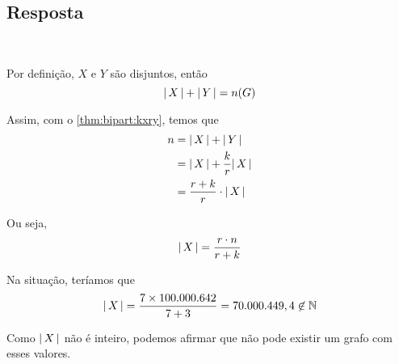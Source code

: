 \subsection{Resposta} ~

Por definição, $X$ e $Y$ são disjuntos, então
\[
    {\left\lvert\,X\,\right\rvert} + {\left\lvert\,Y\,\right\rvert} = n(G)
\]

Assim, com o \cref{thm:bipart:kxry}, temos que
\begin{align*}
    n &= {\left\lvert\,X\,\right\rvert} + {\left\lvert\,Y\,\right\rvert} \\
        &= {\left\lvert\,X\,\right\rvert} + \frac{k}{r} {\left\lvert\,X\,\right\rvert} \\
        &= \frac{r + k}{r} \cdot {\left\lvert\,X\,\right\rvert}
\end{align*}

Ou seja,
\[
    {\left\lvert\,X\,\right\rvert} = \frac{r \cdot n}{r + k}
\]

Na situação, teríamos que
\[
    {\left\lvert\,X\,\right\rvert} = \frac{7 \times 100.000.642}{7 + 3} = 70.000.449,4 \not\in \operatorname{\mathbb{N}}
\]

Como ${\left\lvert\,X\,\right\rvert}$ não é inteiro, podemos afirmar que não pode existir um grafo com esses valores.
